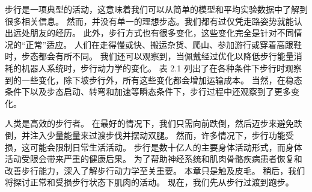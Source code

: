步行是一项典型的活动，这意味着我们可以从简单的模型和平均实验数据中了解到很多相关信息。
然而，并没有单一的理想步态。我们都有过仅凭走路姿势就能认出远处朋友的经历。
此外，步行方式也有很多变化，这些变化完全是针对不同情况的“正常”适应。
人们在走得慢或快、搬运杂货、爬山、参加游行或穿着高跟鞋时，步态都会有所不同。
我们还可以观察到，当佩戴经过优化以降低步行能量消耗的机器人系统时，步行动力学的变化。
表 2.1 列出了在各种条件下步行时观察到的一些变化，除下坡步行外，所有这些变化都会增加运输成本。
当然，在稳态条件下以及步态启动、转弯和加速等瞬态条件下，步行过程中还观察到了更多变化。




人类是高效的步行者。
在最好的情况下，我们只需向前跌倒，然后迈步来避免跌倒，并注入少量能量来过渡步伐并摆动双腿。
然而，许多情况下，步行功能受损，这可能会限制日常生活活动。
步行是数十亿人的主要身体活动形式，而身体活动受限会带来严重的健康后果。
为了帮助神经系统和肌肉骨骼疾病患者恢复和改善步行能力，深入了解步行动力学至关重要。
本章只是触及皮毛。
稍后，我们将探讨正常和受损步行状态下肌肉的活动。
现在，我们先从步行过渡到跑步。













